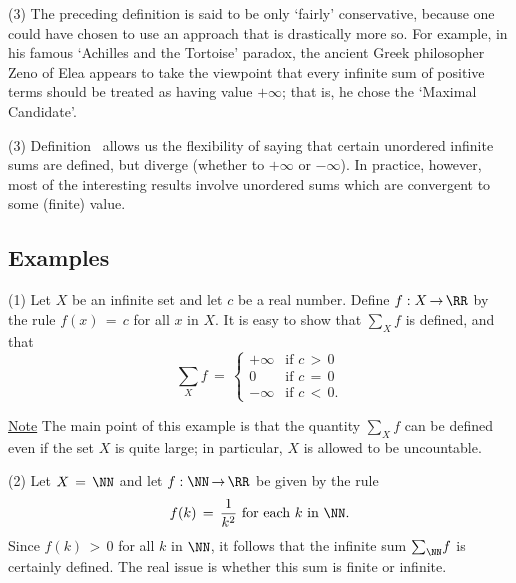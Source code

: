\V

        (3) The preceding definition is said to be only `fairly' conservative, because one could have chosen to use an approach that is drastically more so.
    For example, in his famous `Achilles and the Tortoise' paradox, the ancient Greek philosopher Zeno of Elea
    appears to take the viewpoint that every infinite sum of positive terms should be treated as having value $+{\infty}$;
    that is, he chose the `Maximal Candidate'.

\V

        (3) Definition~ allows us the flexibility of saying that certain unordered infinite sums are defined, but diverge (whether to $+{\infty}$ or $-{\infty}$).
    In practice, however, most of the interesting results involve unordered sums which are convergent to some (finite) value.

\V
\V

            \subsection{\small{\bf Examples}}
            \label{ExampG20.35}

\hspace*{\parindent}(1) Let $X$ be an infinite set and let $c$ be a real number.
    Define $f:X \,{\rightarrow}\, {\RR}$ by the rule $f(x) \,=\, c$ for all $x$ in $X$.
    It is easy to show that ${\sum}_{X} f$ is defined, and that
        \begin{displaymath}
        {\sum}_{X} f \,=\, \left\{
        \begin{array}{cl}
        +{\infty} & \mbox{if $c\,>\,0$}   \\
            0     & \mbox{if $c \,=\, 0$} \\
        -{\infty} & \mbox{if $c\,<\,0$}.
        \end{array}
                                    \right.
        \end{displaymath}

        \underline{Note} The main point of this example is that the quantity ${\sum}_{X} f$ can be defined even if the set $X$ is quite large;
    in particular, $X$ is allowed to be uncountable.

\V

        (2) Let $X \,=\, {\NN}$ and let $f:{\NN} \,{\rightarrow}\, {\RR}$ be given by the rule
        \begin{displaymath}
        f(k) \,=\, \frac{1}{k^{2}} \mbox{ for each $k$ in ${\NN}$}.
        \end{displaymath}
    Since $f(k)\,>\,0$ for all $k$ in ${\NN}$, it follows that the infinite sum ${\sum}_{{\NN}} f$ is certainly defined.
    The real issue is whether this sum is finite or infinite.

